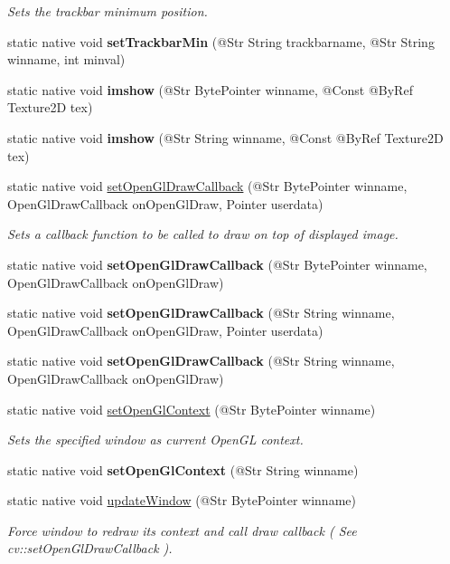 \begin{DoxyCompactItemize}
\begin{DoxyCompactList}\small\item\em Sets the trackbar minimum position. \end{DoxyCompactList}\item 
static native void {\bfseries set\+Trackbar\+Min} (@Str String trackbarname, @Str String winname, int minval)
\item 
static native void {\bfseries imshow} (@Str Byte\+Pointer winname, @Const @By\+Ref Texture2D tex)
\item 
static native void {\bfseries imshow} (@Str String winname, @Const @By\+Ref Texture2D tex)
\item 
static native void \hyperlink{group__highgui__opengl_ga4a0f34ee4ef2378ca514ab2190004a9c}{set\+Open\+Gl\+Draw\+Callback} (@Str Byte\+Pointer winname, Open\+Gl\+Draw\+Callback on\+Open\+Gl\+Draw, Pointer userdata)
\begin{DoxyCompactList}\small\item\em Sets a callback function to be called to draw on top of displayed image. \end{DoxyCompactList}\item 
static native void {\bfseries set\+Open\+Gl\+Draw\+Callback} (@Str Byte\+Pointer winname, Open\+Gl\+Draw\+Callback on\+Open\+Gl\+Draw)
\item 
static native void {\bfseries set\+Open\+Gl\+Draw\+Callback} (@Str String winname, Open\+Gl\+Draw\+Callback on\+Open\+Gl\+Draw, Pointer userdata)
\item 
static native void {\bfseries set\+Open\+Gl\+Draw\+Callback} (@Str String winname, Open\+Gl\+Draw\+Callback on\+Open\+Gl\+Draw)
\item 
static native void \hyperlink{group__highgui__opengl_ga14e8539bd809672c266a0dc6c11e4b91}{set\+Open\+Gl\+Context} (@Str Byte\+Pointer winname)
\begin{DoxyCompactList}\small\item\em Sets the specified window as current Open\+GL context. \end{DoxyCompactList}\item 
static native void {\bfseries set\+Open\+Gl\+Context} (@Str String winname)
\item 
static native void \hyperlink{group__highgui__opengl_ga71eba7e13ffedf80c0d621ae9acacfb8}{update\+Window} (@Str Byte\+Pointer winname)
\begin{DoxyCompactList}\small\item\em Force window to redraw its context and call draw callback ( See cv\+::set\+Open\+Gl\+Draw\+Callback ). \end{DoxyCompactList}\item 

\end{DoxyCompactItemize}
